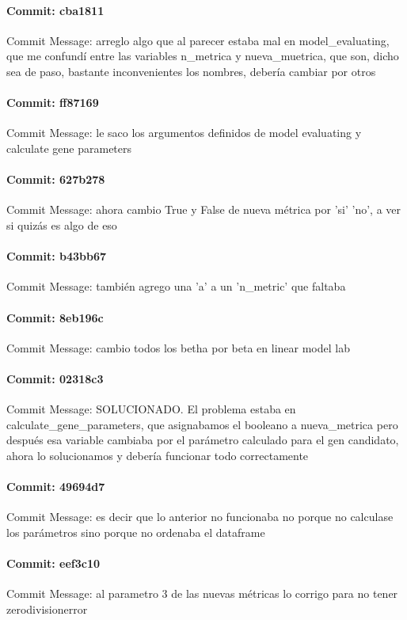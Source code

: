 \documentclass{article}
\begin{document}
\paragraph{Commit: cba1811}
Commit Message: arreglo algo que al parecer estaba mal en model_evaluating, que me confundí entre las variables n_metrica y nueva_muetrica, que son, dicho sea de paso, bastante inconvenientes los nombres, debería cambiar por otros

\paragraph{Commit: ff87169}
Commit Message: le saco los argumentos definidos de model evaluating y calculate gene parameters

\paragraph{Commit: 627b278}
Commit Message: ahora cambio True y False de nueva métrica por 'si' 'no', a ver si quizás es algo de eso

\paragraph{Commit: b43bb67}
Commit Message: también agrego una 'a' a un 'n_metric' que faltaba

\paragraph{Commit: 8eb196c}
Commit Message: cambio todos los betha por beta en linear model lab

\paragraph{Commit: 02318c3}
Commit Message: SOLUCIONADO. El problema estaba en calculate_gene_parameters, que asignabamos el booleano a nueva_metrica pero después esa variable cambiaba por el parámetro calculado para el gen candidato, ahora lo solucionamos y debería funcionar todo correctamente

\paragraph{Commit: 49694d7}
Commit Message: es decir que lo anterior no funcionaba no porque no calculase los parámetros sino porque no ordenaba el dataframe

\paragraph{Commit: eef3c10}
Commit Message: al parametro 3 de las nuevas métricas lo corrigo para no tener zerodivisionerror
\end{document}
